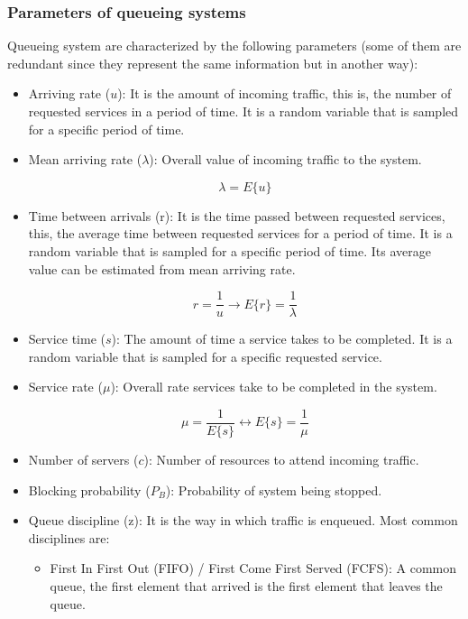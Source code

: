 \documentclass[../main.tex]{subfiles}
\begin{document}
\subsubsection{Parameters of queueing systems}

Queueing system are characterized by the following parameters
(some of them are redundant since they represent the same information but in another way):

\begin{itemize}
	\item {
		Arriving rate ($u$): It is the amount of incoming traffic,
		this is, the number of requested services in a period of time.
		It is a random variable that is sampled for a specific period of time.
	}
	\item {
		Mean arriving rate ($\lambda$): Overall value of incoming traffic to the system.

		$$ \lambda = E\{u\} $$
	}
	\item {
		Time between arrivals (r): It is the time passed between requested services,
		this, the average time between requested services for a period of time.
		It is a random variable that is sampled for a specific period of time.
		Its average value can be estimated from mean arriving rate.

		$$ r = \frac{1}{u} \rightarrow E\{r\} = \frac{1}{\lambda} $$
	}
	\item {
		Service time ($s$): The amount of time a service takes to be completed.
		It is a random variable that is sampled for a specific requested service.
	}
	\item {
		Service rate ($\mu$): Overall rate services take to be completed in the system.

		$$ \mu = \frac{1}{E\{s\}} \leftrightarrow E\{s\} = \frac{1}{\mu} $$
	}
	\item Number of servers ($c$): Number of resources to attend incoming traffic.
	\item Blocking probability ($P_B$): Probability of system being stopped.
	\item {
		Queue discipline (z): It is the way in which traffic is enqueued.
		Most common disciplines are:

		\begin{itemize}
			\item {
				First In First Out (FIFO) / First Come First Served (FCFS): A common queue, the first element that arrived is the first element that leaves the queue.

}
\end{itemize}}
\end{itemize}
\end{document}
